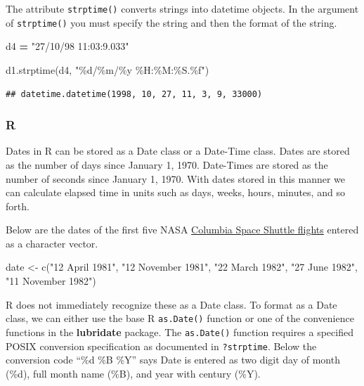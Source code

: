 \documentclass[
]{book}
\newenvironment{Shaded}{\begin{snugshade}}{\end{snugshade}}
\newcommand{\FunctionTok}[1]{\textcolor[rgb]{0.00,0.00,0.00}{#1}}
\newcommand{\NormalTok}[1]{#1}
\newcommand{\OperatorTok}[1]{\textcolor[rgb]{0.81,0.36,0.00}{\textbf{#1}}}
\newcommand{\OtherTok}[1]{\textcolor[rgb]{0.56,0.35,0.01}{#1}}
\newcommand{\SpecialCharTok}[1]{\textcolor[rgb]{0.00,0.00,0.00}{#1}}
\newcommand{\StringTok}[1]{\textcolor[rgb]{0.31,0.60,0.02}{#1}}
\begin{document}
The attribute \texttt{strptime()} converts strings into datetime objects. In the argument of \texttt{strptime()} you must specify the string and then the format of the string.

\begin{Shaded}
\begin{Highlighting}[]
\NormalTok{d4 }\OperatorTok{=} \StringTok{"27/10/98 11:03:9.033"}

\NormalTok{d1.strptime(d4, }\StringTok{"}\SpecialCharTok{\%d}\StringTok{/\%m/\%y \%H:\%M:\%S.}\SpecialCharTok{\%f}\StringTok{"}\NormalTok{)}
\end{Highlighting}
\end{Shaded}

\begin{verbatim}
## datetime.datetime(1998, 10, 27, 11, 3, 9, 33000)
\end{verbatim}

\hypertarget{r-28}{%
\subsubsection*{R}\label{r-28}}

Dates in R can be stored as a Date class or a Date-Time class. Dates are stored as the number of days since January 1, 1970. Date-Times are stored as the number of seconds since January 1, 1970. With dates stored in this manner we can calculate elapsed time in units such as days, weeks, hours, minutes, and so forth.

Below are the dates of the first five NASA \href{https://en.wikipedia.org/wiki/List_of_Space_Shuttle_missions\#Shuttle_flights}{Columbia Space Shuttle flights} entered as a character vector.

\begin{Shaded}
\begin{Highlighting}[]
\NormalTok{date }\OtherTok{\textless{}{-}} \FunctionTok{c}\NormalTok{(}\StringTok{"12 April 1981"}\NormalTok{, }
          \StringTok{"12 November 1981"}\NormalTok{, }
          \StringTok{"22 March 1982"}\NormalTok{, }
          \StringTok{"27 June 1982"}\NormalTok{, }
          \StringTok{"11 November 1982"}\NormalTok{)}
\end{Highlighting}
\end{Shaded}

R does not immediately recognize these as a Date class. To format as a Date class, we can either use the base R \texttt{as.Date()} function or one of the convenience functions in the \textbf{lubridate} package. The \texttt{as.Date()} function requires a specified POSIX conversion specification as documented in \texttt{?strptime}. Below the conversion code ``\%d \%B \%Y'' says Date is entered as two digit day of month (\%d), full month name (\%B), and year with century (\%Y).
\end{document}
